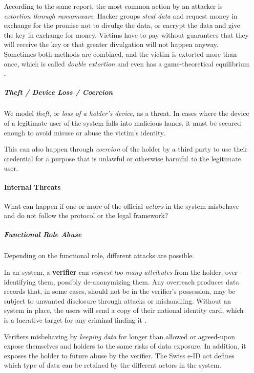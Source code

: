 According to the same report, the most common action by an attacker is \emph{extortion through ransomware}.
Hacker groups \emph{steal data} and request money in exchange for the promise not to divulge the data,
or encrypt the data and give the key in exchange for money.
Victims have to pay without guarantees that they will receive the key or that greater divulgation will not happen anyway.
Sometimes both methods are combined, and the victim is extorted more than once, which is called \emph{double extortion}
and even has a game-theoretical equilibrium \cite{Meurs24}.

\subparagraph{Theft / Device Loss / Coercion}

We model \emph{theft}, or \emph{loss of a holder's device}, as a threat.
In cases where the device of a legitimate user of the system falls into malicious hands, it must be secured enough to avoid misuse or abuse the victim's identity.

This can also happen through \emph{coercion} of the holder by a third party to use their
credential for a purpose that is unlawful or otherwise harmful to the legitimate user.

\paragraph{Internal Threats}
\label{p:internal-threats}

What can happen if one or more of the official \emph{actors} in the \eid system
misbehave and do not follow the protocol or the legal framework?

\subparagraph{Functional Role Abuse}

Depending on the functional role, different attacks are possible. 

In an \eid system, a \textbf{verifier} can \emph{request too many attributes} 
from the holder, over-identifying them, possibly de-anonymizing them. 
Any overreach produces data records that, in some cases, should not be in the verifier’s possession, may be subject to unwanted disclosure through attacks or mishandling.
Without an \eid system in place, the users will send a copy of their national identity card, which is a lucrative target for any criminal finding it \cite{Tea25}.

Verifiers misbehaving by \emph{keeping data} for longer than allowed or agreed-upon expose themselves and holders to the same risks of data exposure. 
In addition, it exposes the holder to future abuse by the verifier.
The Swiss e-ID act defines which type of data can be retained by the different actors in the system.

